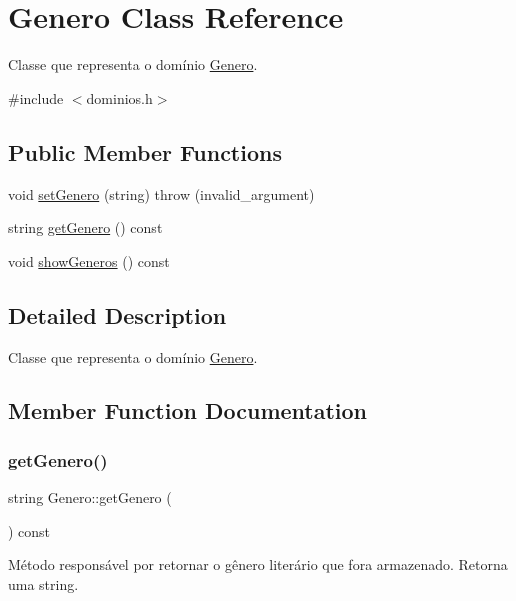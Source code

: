 \hypertarget{classGenero}{}\section{Genero Class Reference}
\label{classGenero}


Classe que representa o domínio \hyperlink{classGenero}{Genero}.  




{\ttfamily \#include $<$dominios.\+h$>$}

\subsection*{Public Member Functions}
\begin{DoxyCompactItemize}
\item 
void \hyperlink{classGenero_adc53f59f5147fb37da8782378cffda9c}{set\+Genero} (string)  throw (invalid\+\_\+argument)
\item 
string \hyperlink{classGenero_aa2a093d178f71b41a07b2b497494e7b4}{get\+Genero} () const
\item 
void \hyperlink{classGenero_a1f7c047f6d2c5b75520673a5c3cca6a6}{show\+Generos} () const
\end{DoxyCompactItemize}


\subsection{Detailed Description}
Classe que representa o domínio \hyperlink{classGenero}{Genero}. 

\subsection{Member Function Documentation}
\mbox{\label{classGenero_aa2a093d178f71b41a07b2b497494e7b4}} 
\subsubsection{\texorpdfstring{get\+Genero()}{getGenero()}}
{\footnotesize\ttfamily string Genero\+::get\+Genero (\begin{DoxyParamCaption}{ }\end{DoxyParamCaption}) const\hspace{0.3cm}{\ttfamily [inline]}}

Método responsável por retornar o gênero literário que fora armazenado. Retorna uma string. \mbox{\label{classGenero_adc53f59f5147fb37da8782378cffda9c}} 
